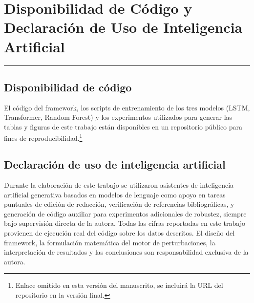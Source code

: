 \chapter{Disponibilidad de Código y Declaración de Uso de Inteligencia Artificial}
\hrule \bigskip \vspace*{1cm}

\section{Disponibilidad de código}

El código del framework, los scripts de entrenamiento de los tres modelos (LSTM, Transformer, Random Forest) y los experimentos utilizados para generar las tablas y figuras de este trabajo están disponibles en un repositorio público para fines de reproducibilidad.\footnote{Enlace omitido en esta versión del manuscrito, se incluirá la URL del repositorio en la versión final.}

\section{Declaración de uso de inteligencia artificial}

Durante la elaboración de este trabajo se utilizaron asistentes de inteligencia artificial generativa basados en modelos de lenguaje como apoyo en tareas puntuales de edición de redacción, verificación de referencias bibliográficas, y generación de código auxiliar para experimentos adicionales de robustez, siempre bajo supervisión directa de la autora. Todas las cifras reportadas en este trabajo provienen de ejecución real del código sobre los datos descritos. El diseño del framework, la formulación matemática del motor de perturbaciones, la interpretación de resultados y las conclusiones son responsabilidad exclusiva de la autora.
